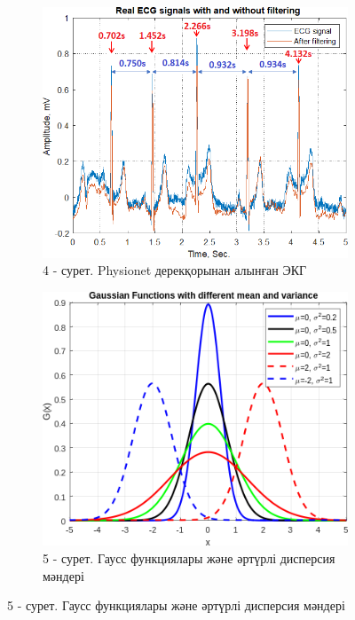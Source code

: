 \begin{figure}[H]
    \centering
    \begin{subfigure}{0.49\textwidth}
        \centering
        \includegraphics[width=\linewidth]{media/ict/image43}
        \caption*{4 - сурет. Physionet дерекқорынан алынған ЭКГ\vspace{4mm}}
    \end{subfigure}
    \hfill
    \begin{subfigure}{0.49\textwidth}
        \centering
        \includegraphics[width=\linewidth]{media/ict/image44}
        \caption*{5 - сурет. Гаусс функциялары және әртүрлі дисперсия мәндері}
    \end{subfigure}
\end{figure}

